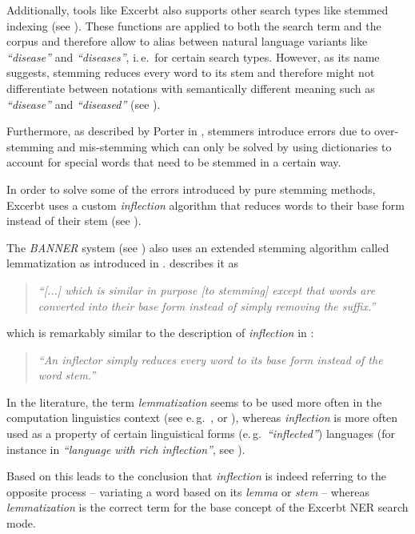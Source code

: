 \documentclass[a4paper, 12pt, twoside, reqn]{report}
\numberwithin{figure}{chapter}
\newtheorem[L]{boxedDefinition}{Definition}
\newtheorem[L]{boxedExample}{Example}
\newcommand{\ie}{i.\,e.\ }
\newcommand{\eg}{e.\,g.\ }
\newcommand{\itquote}[1]{\textit{{``}#1{''}}}
\begin{document}
Additionally, tools like Excerbt also supports other search types like stemmed indexing (see \cite[section 4.3 \& section 4.3.1]{wachinger2013next}). These functions are applied to both the search term and the corpus and therefore allow to alias between natural language variants like \itquote{disease} and \itquote{diseases}, \ie for certain search types. However, as its name suggests, stemming reduces every word to its stem and therefore might not differentiate between notations with semantically different meaning such as \itquote{disease} and \itquote{diseased} (see \cite[section 4.3]{wachinger2013next}).

Furthermore, as described by Porter in \cite[section 3]{porter2001snowball}, stemmers introduce errors due to over-stemming and mis-stemming which can only be solved by using dictionaries to account for special words that need to be stemmed in a certain way.

In order to solve some of the errors introduced by pure stemming methods, Excerbt uses a custom \textit{inflection} algorithm that reduces words to their base form instead of their stem (see \cite[section 4.3, page 79]{wachinger2013next}).

The \textit{BANNER} system (see \cite{leaman2008banner}) also uses an extended stemming algorithm called lemmatization as introduced in \cite{vlachos2007tackling}. \cite[section 3]{leaman2008banner} describes it as
\begin{quote}
\itquote{[...] which is similar in purpose [to stemming] except that words are converted into their base form instead of simply removing the suffix.}
\end{quote}
which is remarkably similar to the description of \textit{inflection} in \cite[section 4.3]{wachinger2013next}:
\begin{quote}
\itquote{An inflector simply reduces every word to its base form instead of the word stem.} 
\end{quote}

In the literature, the term \textit{lemmatization} seems to be used more often in the computation linguistics context (see \eg \cite{liu2012biolemmatizer}, \cite{paulussen1992dilemma} or \cite{Lezius1998}), whereas \textit{inflection} is more often used as a property of certain linguistical forms (\eg \itquote{inflected}) languages (for instance in \itquote{language with rich inflection}, see \cite{abacha2011medical}).

Based on \cite[section 2.2.4]{manning2008introduction} this leads to the conclusion that \textit{inflection} is indeed referring to the opposite process -- variating a word based on its \textit{lemma} or \textit{stem} -- whereas \textit{lemmatization} is the correct term for the base concept of the Excerbt NER search mode.
\end{document}
